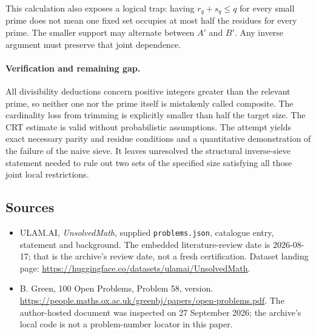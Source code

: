 \documentclass[11pt,a4paper]{article}
\begin{document}
This calculation also exposes a logical trap: having $r_q+s_q\leq q$ for every small prime does not mean one fixed set occupies at most half the residues for every prime. The smaller support may alternate between $A'$ and $B'$. Any inverse argument must preserve that joint dependence.

\paragraph{Verification and remaining gap.}
All divisibility deductions concern positive integers greater than the relevant prime, so neither one nor the prime itself is mistakenly called composite. The cardinality loss from trimming is explicitly smaller than half the target size. The CRT estimate is valid without probabilistic assumptions. The attempt yields exact necessary parity and residue conditions and a quantitative demonstration of the failure of the naive sieve. It leaves unresolved the structural inverse-sieve statement needed to rule out two sets of the specified size satisfying all those joint local restrictions.

\subsection{Sources}

{\small

\begin{itemize}

\item[\hypertarget{source:statement:1}{S1}] ULAM.AI, \emph{UnsolvedMath}, supplied \texttt{problems.json}, catalogue entry, statement and background. The embedded literature-review date is 2026-08-17; that is the archive’s review date, not a fresh certification. Dataset landing page: \url{https://huggingface.co/datasets/ulamai/UnsolvedMath}.

\item[\hypertarget{source:statement:2}{S2}] B. Green, 100 Open Problems, Problem 58, version. \url{https://people.maths.ox.ac.uk/greenbj/papers/open-problems.pdf}. The author-hosted document was inspected on 27 September 2026; the archive’s local code is not a problem-number locator in this paper.

\end{itemize}

}

\label{end:statement}
\end{document}
